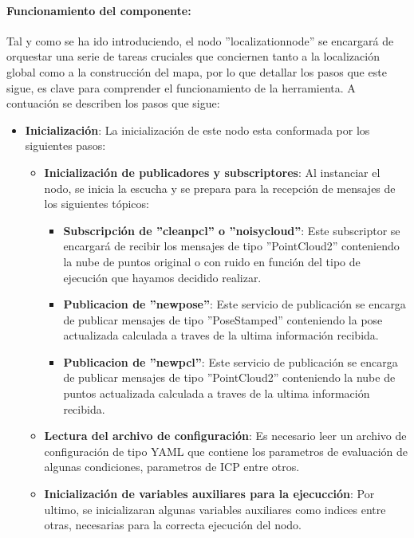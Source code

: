 \documentclass[12pt, a4paper, twoside]{article}
\begin{document}
\paragraph{Funcionamiento del componente:}
Tal y como se ha ido introduciendo, el nodo ''localization\textunderscore node'' se encargará de orquestar una serie de tareas cruciales que conciernen tanto 
a la localización global como a la construcción del mapa, por lo que detallar los pasos que este sigue, es clave para comprender el funcionamiento de la herramienta. 
A contuación se describen los pasos que sigue:
\begin{itemize}
  \item \textbf{Inicialización}: La inicialización de este nodo esta conformada por los siguientes pasos:
  \begin{itemize}
    \item \textbf{Inicialización de publicadores y subscriptores}: Al instanciar el nodo, se inicia la escucha y se prepara para la recepción de mensajes de los 
    siguientes tópicos:
    \begin{itemize}
      \item \textbf{Subscripción de ''clean\textunderscore pcl'' o ''noisy\textunderscore cloud''}: Este subscriptor se encargará de recibir los mensajes de tipo 
      ''PointCloud2'' conteniendo la nube de puntos original o con ruido en función del tipo de ejecución que hayamos decidido realizar.
      \item \textbf{Publicacion de ''new\textunderscore pose''}: Este servicio de publicación se encarga de publicar mensajes de tipo ''PoseStamped'' conteniendo 
      la pose actualizada calculada a traves de la ultima información recibida.
      \item \textbf{Publicacion de ''new\textunderscore pcl''}: Este servicio de publicación se encarga de publicar mensajes de tipo ''PointCloud2'' conteniendo 
      la nube de puntos actualizada calculada a traves de la ultima información recibida.
    \end{itemize}
    \item \textbf{Lectura del archivo de configuración}: Es necesario leer un archivo de configuración de tipo YAML que contiene los parametros de evaluación de 
    algunas condiciones, parametros de ICP entre otros.
    \item \textbf{Inicialización de variables auxiliares para la ejecucción}: Por ultimo, se inicializaran algunas variables auxiliares como indices entre otras, necesarias 
    para la correcta ejecución del nodo.

\end{itemize}
\end{itemize}
\end{document}
